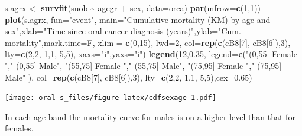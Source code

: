 \documentclass[
]{book}
\newenvironment{Shaded}{\begin{snugshade}}{\end{snugshade}}
\newcommand{\AttributeTok}[1]{\textcolor[rgb]{0.13,0.29,0.53}{#1}}
\newcommand{\DecValTok}[1]{\textcolor[rgb]{0.00,0.00,0.81}{#1}}
\newcommand{\FloatTok}[1]{\textcolor[rgb]{0.00,0.00,0.81}{#1}}
\newcommand{\FunctionTok}[1]{\textcolor[rgb]{0.13,0.29,0.53}{\textbf{#1}}}
\newcommand{\NormalTok}[1]{#1}
\newcommand{\OtherTok}[1]{\textcolor[rgb]{0.56,0.35,0.01}{#1}}
\newcommand{\SpecialCharTok}[1]{\textcolor[rgb]{0.81,0.36,0.00}{\textbf{#1}}}
\newcommand{\StringTok}[1]{\textcolor[rgb]{0.31,0.60,0.02}{#1}}
\begin{document}
\begin{Shaded}
\begin{Highlighting}[]
\NormalTok{s.agrx }\OtherTok{\textless{}{-}} \FunctionTok{survfit}\NormalTok{(suob }\SpecialCharTok{\textasciitilde{}}\NormalTok{ agegr }\SpecialCharTok{+}\NormalTok{ sex, }\AttributeTok{data=}\NormalTok{orca)}
\FunctionTok{par}\NormalTok{(}\AttributeTok{mfrow=}\FunctionTok{c}\NormalTok{(}\DecValTok{1}\NormalTok{,}\DecValTok{1}\NormalTok{))}
\FunctionTok{plot}\NormalTok{(s.agrx, }\AttributeTok{fun=}\StringTok{"event"}\NormalTok{, }\AttributeTok{main=}\StringTok{"Cumulative mortality (KM) by age and sex"}\NormalTok{,}\AttributeTok{xlab=}\StringTok{"Time since oral cancer diagnosis (years)"}\NormalTok{,}\AttributeTok{ylab=}\StringTok{"Cum. mortality"}\NormalTok{,}\AttributeTok{mark.time=}\NormalTok{F, }\AttributeTok{xlim =} \FunctionTok{c}\NormalTok{(}\DecValTok{0}\NormalTok{,}\DecValTok{15}\NormalTok{), }\AttributeTok{lwd=}\DecValTok{2}\NormalTok{,}
             \AttributeTok{col=}\FunctionTok{rep}\NormalTok{(}\FunctionTok{c}\NormalTok{(cB8[}\DecValTok{7}\NormalTok{], cB8[}\DecValTok{6}\NormalTok{]),}\DecValTok{3}\NormalTok{), }\AttributeTok{lty=}\FunctionTok{c}\NormalTok{(}\DecValTok{2}\NormalTok{,}\DecValTok{2}\NormalTok{, }\DecValTok{1}\NormalTok{,}\DecValTok{1}\NormalTok{, }\DecValTok{5}\NormalTok{,}\DecValTok{5}\NormalTok{),}
     \AttributeTok{xaxs=}\StringTok{"i"}\NormalTok{,}\AttributeTok{yaxs=}\StringTok{"i"}\NormalTok{)}
\FunctionTok{legend}\NormalTok{(}\DecValTok{12}\NormalTok{,}\FloatTok{0.35}\NormalTok{, }\AttributeTok{legend=}\FunctionTok{c}\NormalTok{(}\StringTok{"(0,55] Female "}\NormalTok{,}\StringTok{" (0,55] Male"}\NormalTok{,}
                       \StringTok{"(55,75] Female "}\NormalTok{,}\StringTok{" (55,75] Male"}\NormalTok{,}
                       \StringTok{"(75,95] Female "}\NormalTok{,}\StringTok{" (75,95] Male"}\NormalTok{ ),}
       \AttributeTok{col=}\FunctionTok{rep}\NormalTok{(}\FunctionTok{c}\NormalTok{(cB8[}\DecValTok{7}\NormalTok{], cB8[}\DecValTok{6}\NormalTok{]),}\DecValTok{3}\NormalTok{), }\AttributeTok{lty=}\FunctionTok{c}\NormalTok{(}\DecValTok{2}\NormalTok{,}\DecValTok{2}\NormalTok{, }\DecValTok{1}\NormalTok{,}\DecValTok{1}\NormalTok{, }\DecValTok{5}\NormalTok{,}\DecValTok{5}\NormalTok{),}\AttributeTok{cex=}\FloatTok{0.65}\NormalTok{)}
\end{Highlighting}
\end{Shaded}

\texttt{[image: oral-s\_files/figure-latex/cdfsexage-1.pdf]}

In each age band the mortality curve for males is on a higher level
than that for females.
\end{document}
